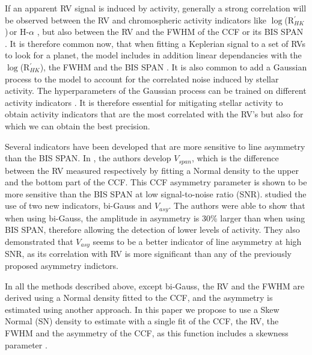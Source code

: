 \documentclass[11pt, oneside]{article}
\def\logrhk{$\log$(R$^{\prime}_{HK}$)}
\begin{document}
If an apparent RV signal is induced by activity, generally a strong correlation will be observed between the RV and chromospheric activity indicators like \logrhk\,or H-$\alpha$ \citep{Boisse-2009,Dumusque-2012,Robertson-2014}, but also between the RV and the FWHM of the CCF or its BIS SPAN \citep[][]{Queloz-2001,Boisse-2009,Queloz-2009,Dumusque-2016a}. 
%
It is therefore common now, that when fitting a Keplerian signal to a set of RVs to look for a planet, the model includes in addition linear dependancies with the \logrhk, the FWHM and the BIS SPAN \citep{Dumusque:2017aa,Feng:2017aa}.
%
It is also common to add a Gaussian process to the model to account for the correlated noise induced by stellar activity. The hyperparameters of the Gaussian process can be trained on different activity indicators \citep{Haywood-2014,Rajpaul-2015}. It is therefore essential for mitigating stellar activity to obtain activity indicators that are the most correlated with the RV's but also for which we can obtain the best precision.

Several indicators have been developed that are more sensitive to line asymmetry than the BIS SPAN. In \citet{Boisse-2011}, the authors develop $V_{span}$, which is the difference between the RV measured respectively by fitting a Normal density to the upper and the bottom part of the CCF. This CCF asymmetry parameter is shown to be more sensitive than the BIS SPAN at low signal-to-noise ratio (SNR).
%
\citet{Figueira-2013} studied the use of two new indicators, bi-Gauss and $V_{asy}$. The authors were able to show that when using bi-Gauss, the amplitude in asymmetry is 30\% larger than when using BIS SPAN, therefore allowing the detection of lower levels of activity. They also demonstrated that $V_{asy}$ seems to be a better indicator of line asymmetry at high SNR, as its correlation with RV is more significant than any of the previously proposed asymmetry indictors.

In all the methods described above, except bi-Gauss, the RV and the FWHM are derived using a Normal density fitted to the CCF, and the asymmetry is estimated using another approach. 
%
In this paper we propose to use a Skew Normal (SN) density to estimate with a single fit of the CCF, the RV, the FWHM and the asymmetry of the CCF, as this function includes a skewness parameter \citep[][]{Azzalini1985}. 
\end{document}

